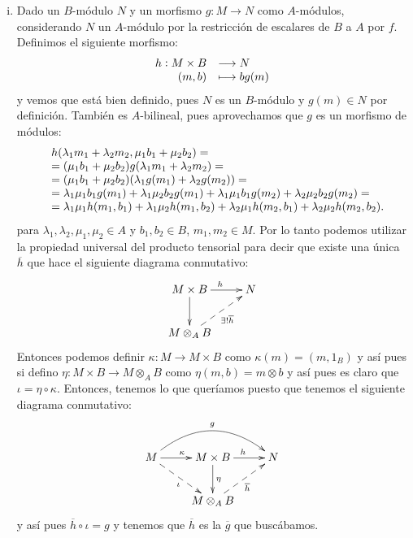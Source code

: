 \documentclass[../../../main.tex]{subfiles}
\begin{document}
\begin{sol}
\begin{enumerate}[(i)]
    \item Dado un $B$-módulo $N$ y un morfismo $g:M\to N$ como $A$-módulos, considerando $N$ un $A$-módulo por la restricción de escalares de $B$ a $A$ por $f$. Definimos el siguiente morfismo:
    \begin{equation}
        \notag
        \begin{array}{rl}
            h:M\times B & \longrightarrow N \\
            (m,b) & \longmapsto bg(m)
        \end{array}
    \end{equation}
    y vemos que está bien definido, pues $N$ es un $B$-módulo y $g(m)\in N$ por definición. También es $A$-bilineal, pues aprovechamos que $g$ es un morfismo de módulos:
    \begin{equation}
        \notag
        \begin{array}{rl}
            &h(\lambda_1m_1+\lambda_2m_2,\mu_1b_1+\mu_2b_2) = \\
            &= (\mu_1b_1+\mu_2b_2)g(\lambda_1m_1+\lambda_2m_2) = \\
            &= (\mu_1b_1+\mu_2b_2)(\lambda_1g(m_1)+\lambda_2g(m_2))= \\
            &= \lambda_1\mu_1b_1g(m_1)+\lambda_1\mu_2b_2g(m_1) + \lambda_1\mu_1b_1g(m_2)+\lambda_2\mu_2b_2g(m_2) = \\
            &=\lambda_1\mu_1h(m_1,b_1)+\lambda_1\mu_2h(m_1,b_2)+\lambda_2\mu_1h(m_2,b_1)+\lambda_2\mu_2h(m_2,b_2).
        \end{array}
    \end{equation}
    para $\lambda_1,\lambda_2,\mu_1,\mu_2\in A$ y $b_1,b_2\in B$, $m_1,m_2\in M$.
    Por lo tanto podemos utilizar la propiedad universal del producto tensorial para decir que existe una única $\overline{h}$ que hace el siguiente diagrama conmutativo:
    \begin{equation}
        \notag
        \xymatrix{
        M\times B\ar[r]^h\ar[d] & N \\
        M\otimes_AB\ar@{-->}[ur]_{\exists!\overline{h}} & 
        }
    \end{equation}
    Entonces podemos definir $\kappa:M\to M\times B$ como $\kappa(m) = (m,1_B)$ y así pues si defino $\eta:M\times B\to M\otimes_AB$ como $\eta(m,b) = m\otimes b$ y así pues es claro que $\iota = \eta\circ \kappa$. Entonces, tenemos lo que queríamos puesto que tenemos el siguiente diagrama conmutativo:
    \begin{equation}
        \notag
        \xymatrix{
        M \ar[r]^{\kappa} \ar@{-->}[dr]_{\iota} \ar@/^2pc/[rr]^g & M\times B\ar[d]^\eta\ar[r]^h & N\\
        & M\otimes_AB\ar@{-->}[ur]_{\overline{h}}
        }
    \end{equation}
    y así pues $\overline{h}\circ \iota = g$ y tenemos que $\overline{h}$ es la $\overline{g}$ que buscábamos. 
    

\end{enumerate}
\end{sol}
\end{document}

